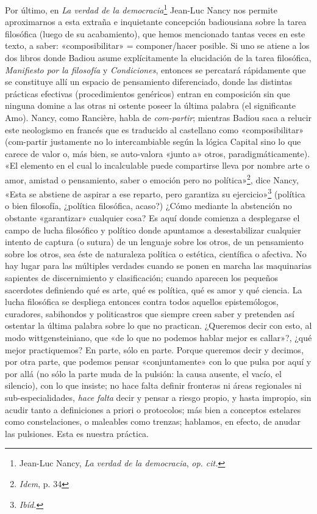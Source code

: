 Por último, en \emph{La verdad de la democracia}\footnote{Jean-Luc Nancy, \emph{La verdad de la democracia}, \emph{op. cit.}} Jean-Luc Nancy nos permite aproximarnos a esta extraña e inquietante concepción badiousiana sobre la tarea filosófica (luego de su acabamiento), que hemos mencionado tantas veces en este texto, a saber: «composibilitar» = componer/hacer posible. Si uno se atiene a los dos libros donde Badiou asume explícitamente la elucidación de la tarea filosófica, \emph{Manifiesto por la filosofía} y \emph{Condiciones}, entonces se percatará rápidamente que se constituye allí un espacio de pensamiento diferenciado, donde las distintas prácticas efectivas (procedimientos genéricos) entran en composición sin que ninguna domine a las otras ni ostente poseer la última palabra (el significante Amo). Nancy, como Rancière, habla de \emph{com-partir}; mientras Badiou saca a relucir este neologismo en francés que es traducido al castellano como «composibilitar» (com-partir justamente no lo intercambiable según la lógica Capital sino lo que carece de valor o, más bien, se auto-valora «junto a» otros, paradigmáticamente). «El elemento en el cual lo incalculable puede compartirse lleva por nombre arte o amor, amistad o pensamiento, saber o emoción pero no política»\footnote{\emph{Idem}, p. 34}, dice Nancy, «Esta se abstiene de aspirar a ese reparto, pero garantiza su ejercicio»\footnote{\emph{Ibíd.}} (política o bien filosofía, ¿política filosófica, acaso?) ¿Cómo mediante la abstención no obstante «garantizar» cualquier cosa? Es aquí donde comienza a desplegarse el campo de lucha filosófico y político donde apuntamos a desestabilizar cualquier intento de captura (o sutura) de un lenguaje sobre los otros, de un pensamiento sobre los otros, sea éste de naturaleza política o estética, científica o afectiva. No hay lugar para las múltiples verdades cuando se ponen en marcha las maquinarias sapientes de discernimiento y clasificación; cuando aparecen los pequeños sacerdotes definiendo qué es arte, qué es política, qué es amor y qué ciencia. La lucha filosófica se despliega entonces contra todos aquellos epistemólogos, curadores, sabihondos y politicastros que siempre creen saber y pretenden así ostentar la última palabra sobre lo que no practican. ¿Queremos decir con esto, al modo wittgensteiniano, que «de lo que no podemos hablar mejor es callar»?, ¿qué mejor practiquemos? En parte, sólo en parte. Porque queremos decir y decimos, por otra parte, que podemos pensar «conjuntamente» con lo que pulsa por aquí y por allá (no sólo la parte muda de la pulsión: la causa ausente, el vacío, el silencio), con lo que insiste; no hace falta definir fronteras ni áreas regionales ni sub-especialidades, \emph{hace falta} decir y pensar a riesgo propio, y hasta impropio, sin acudir tanto a definiciones a priori o protocolos; más bien a conceptos estelares como constelaciones, o maleables como trenzas; hablamos, en efecto, de anudar las pulsiones. Esta es nuestra práctica.


